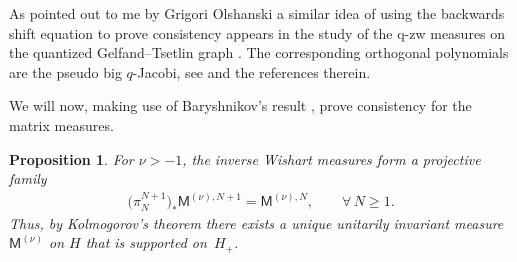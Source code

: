 \documentclass[pdftex]{sigma}
\numberwithin{equation}{section}
\newtheorem{Proposition}[Theorem]{Proposition}
{ \theoremstyle{definition}
\newtheorem{Definition}[Theorem]{Definition}
\newtheorem{Remark}[Theorem]{Remark} }
\begin{document}
\begin{Remark}
As pointed out to me by Grigori Olshanski a similar idea of using the backwards shift equation to prove consistency appears in the study of the q-zw measures on the quantized Gelfand--Tsetlin graph \cite{GorinOlshanski}. The corresponding orthogonal polynomials are the pseudo big $q$-Jacobi, see \cite{GorinOlshanski} and the references therein.
\end{Remark}

We will now, making use of Baryshnikov's result \cite{Baryshnikov}, prove consistency for the matrix measures.

\begin{Proposition}\label{consistencymatrices}For $\nu>-1$, the inverse Wishart measures form a projective family
\begin{gather*}
\big(\pi_{N}^{N+1}\big)_*\mathsf{M}^{(\nu),N+1}=\mathsf{M}^{(\nu),N}, \qquad \forall\, N\ge 1.
\end{gather*}
Thus, by Kolmogorov's theorem there exists a unique unitarily invariant measure $\mathsf{M}^{(\nu)}$ on $H$ that is supported on~$H_{+}$.
\end{Proposition}
\end{document}

